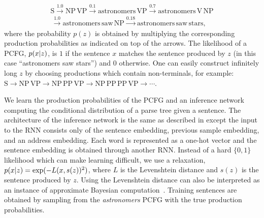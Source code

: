 \par\nobreak\vspace{-1.2em}
{\small
\begin{align*}
  \text{S} \xrightarrow{1.0} \text{NP}\,\text{VP} \xrightarrow{0.1} \text{astronomers}\,\text{VP} \xrightarrow{0.7} \text{astronomers}\,\text{V}\,\text{NP} \\
  \,\xrightarrow{1.0} \text{astronomers}\,\text{saw}\,\text{NP} \xrightarrow{0.18} \text{astronomers}\,\text{saw}\,\text{stars},
\end{align*}
}%
where the probability $p(z)$ is obtained by multiplying the corresponding production probabilities as indicated on top of the arrows.
The likelihood of a \gls{PCFG}, $p(x \lvert z)$, is $1$ if the sentence $x$ matches the sentence produced by $z$ (in this case ``astronomers saw stars'') and $0$ otherwise.
One can easily construct infinitely long $z$ by choosing productions which contain non-terminals, for example: $\text{S} \to \text{NP}\,\text{VP} \to \text{NP}\,\text{PP}\,\text{VP} \to \text{NP}\,\text{PP}\,\text{PP}\,\text{VP} \to \cdots$.


We learn the production probabilities of the \gls{PCFG} and an inference network computing the conditional distribution of a parse tree given a sentence.
%
The architecture of the inference network is the same as described in \citep[Section 3.3]{le2017inference} except the input to the \gls{RNN} consists only of the sentence embedding, previous sample embedding, and an address embedding.
%
Each word is represented as a one-hot vector and the sentence embedding is obtained through another \gls{RNN}.
%
Instead of a hard $\{0, 1\}$ likelihood which can make learning difficult, we use a relaxation, $p(x \lvert z) = \exp(-L(x, s(z))^2)$, where $L$ is the Levenshtein distance and $s(z)$ is the sentence produced by $z$.
%
Using the Levenshtein distance can also be interpreted as an instance of approximate Bayesian computation~\citep{sisson2018handbook}.
%
Training sentences are obtained by sampling from the \emph{astronomers} \gls{PCFG} with the true production probabilities.

